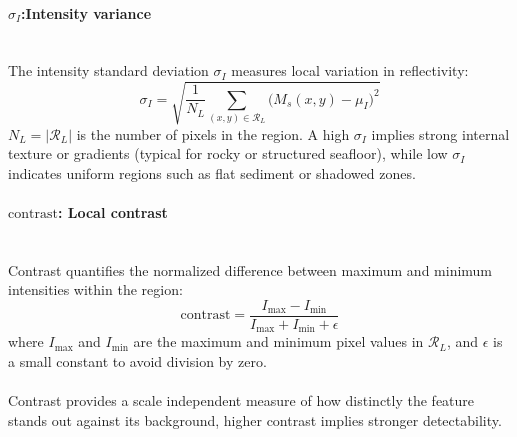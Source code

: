 \paragraph{$\sigma_I$:Intensity variance} \mbox{}\\[0.5em] \noindent
The intensity standard deviation $\sigma_I$ measures local variation in reflectivity:
\begin{equation}
    \sigma_I = 
    \sqrt{\frac{1}{N_L} \sum_{(x,y) \in \mathcal{R}_L} 
    \big(M_s(x,y) - \mu_I\big)^2}
    \label{eq:local-map-generation-std-intensity}
\end{equation}
$N_L = |\mathcal{R}_L|$ is the number of pixels in the region. A high $\sigma_I$ implies strong internal texture or gradients (typical for rocky or structured seafloor), while low $\sigma_I$ indicates uniform regions such as flat sediment or shadowed zones.

\newpage

\paragraph{$\text{contrast}$: Local contrast} \mbox{}\\[0.5em] \noindent
Contrast quantifies the normalized difference between maximum and minimum intensities within the region:
\begin{equation}
    \text{contrast} =
    \frac{I_{\max} - I_{\min}}{I_{\max} + I_{\min} + \epsilon}
    \label{eq:local-map-generation-contrast}
\end{equation}
where $I_{\max}$ and $I_{\min}$ are the maximum and minimum pixel values in $\mathcal{R}_L$, and $\epsilon$ is a small constant to avoid division by zero. 
\\ \\
Contrast provides a scale independent measure of how distinctly the feature stands out against its background, higher contrast implies stronger detectability.

